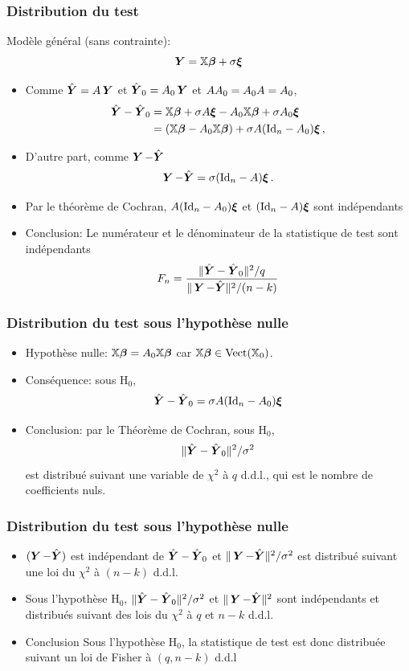 \begin{frame}
\frametitle{Distribution du test}
\alert{Modèle général (sans contrainte)}:
\[
\operatorname{\boldsymbol{Y}}= \mathbb{X} \boldsymbol{\beta} + \sigma \boldsymbol{\xi} 
\]
\begin{itemize}
\item Comme $\hat{\boldsymbol{Y}} = A \operatorname{\boldsymbol{Y}}$ et $\hat{\boldsymbol{Y}}_0= A_0 \operatorname{\boldsymbol{Y}}$ et $A A_0= A_0 A= A_0$,
\begin{align*}
\hat{\boldsymbol{Y}} - \hat{\boldsymbol{Y}}_0&= \mathbb{X} \boldsymbol{\beta} + \sigma A \boldsymbol{\xi} - A_0 \mathbb{X} \boldsymbol{\beta} + \sigma A_0 \boldsymbol{\xi} \\
&= (\mathbb{X} \boldsymbol{\beta} - A_0 \mathbb{X} \boldsymbol{\beta}) + \sigma A (\mathrm{Id}_{n} - A_0) \boldsymbol{\xi} \,,
\end{align*}
\item D'autre part, comme $\operatorname{\boldsymbol{Y}} - \hat{\boldsymbol{Y}}$
\[
\operatorname{\boldsymbol{Y}} - \hat{\boldsymbol{Y}}= \sigma (\mathrm{Id}_{n} - A) \boldsymbol{\xi} \,.
\]
\item Par le théorème de Cochran, $A(\mathrm{Id}_{n} - A_0) \boldsymbol{\xi}$ et $(\mathrm{Id}_{n} - A) \boldsymbol{\xi}$ sont \alert{indépendants}
\item \alert{Conclusion:} Le numérateur et le dénominateur de la statistique de test sont \alert{indépendants}
\[
F_n = \frac{\|\hat{\boldsymbol{Y}} - \hat{\boldsymbol{Y}}_0\|^2/q}{\| \operatorname{\boldsymbol{Y}} - \hat{\boldsymbol{Y}}\|^2/(n-k)}
\]
\end{itemize}
\end{frame}

\begin{frame}
\frametitle{Distribution du test sous l'hypothèse nulle}
\begin{itemize}
\item \alert{Hypothèse nulle}: $\mathbb{X} \boldsymbol{\beta} = A_0 \mathbb{X} \boldsymbol{\beta}$ car $\mathbb{X} \boldsymbol{\beta} \in \mathrm{Vect}(\mathbb{X}_0)$. 
\item \alert{Conséquence}: sous $\mathrm{H}_0$,  
\[ 
\hat{\boldsymbol{Y}} - \hat{\boldsymbol{Y}}_0 =  \sigma A (\mathrm{Id}_{n} - A_0) \boldsymbol{\xi}
\]
\item \alert{Conclusion}: par le Théorème de Cochran,  sous $\mathrm{H}_0$, 
$$
\| \hat{\boldsymbol{Y}} - \hat{\boldsymbol{Y}}_0 \|^2/ \sigma^2
$$
est distribué suivant une variable de $\chi^2$  à $q$ d.d.l., qui est le nombre de coefficients nuls.
\end{itemize}
\end{frame}

\begin{frame}
\frametitle{Distribution du test sous l'hypothèse nulle}
\begin{itemize}
\item $(\operatorname{\boldsymbol{Y}} - \hat{\boldsymbol{Y}})$ est indépendant de $\hat{\boldsymbol{Y}} - \hat{\boldsymbol{Y}}_0$ et $\| \operatorname{\boldsymbol{Y}} - \hat{\boldsymbol{Y}} \|^2/ \sigma^2$ est distribué suivant une loi du $\chi^2$ à $(n-k)$ d.d.l.
\item Sous l'hypothèse $\mathrm{H}_0$, $\| \hat{\boldsymbol{Y}} - \hat{\boldsymbol{Y}}_0 \|^2/\sigma^2$ et $\| \operatorname{\boldsymbol{Y}} - \hat{\boldsymbol{Y}} \|^2$ sont \alert{indépendants} et distribués suivant des lois du $\chi^2$ à \alert{$q$} et \alert{$n-k$} d.d.l.
\item \alert{Conclusion}  Sous l'hypothèse $\mathrm{H}_0$, la statistique de test est donc distribuée suivant \alert{un loi de Fisher} à $(q,n-k)$ d.d.l
\end{itemize}
\end{frame}

